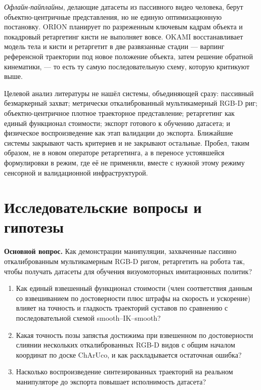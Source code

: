 \documentclass[12pt, a4paper, oneside]{report}
\begin{document}
\emph{Офлайн-пайплайны}, делающие датасеты из пассивного видео человека, берут
объектно-центричные представления, но не единую оптимизационную постановку. ORION
планирует по разреженным ключевым кадрам объекта и покадровый ретаргетинг кисти не
выполняет вовсе. OKAMI восстанавливает модель тела и кисти и ретаргетит в две
развязанные стадии --- варпинг референсной траектории под новое положение объекта,
затем решение обратной кинематики, --- то есть ту самую последовательную схему,
которую критикуют выше.

Целевой анализ литературы не нашёл системы, объединяющей сразу: пассивный
безмаркерный захват; метрически откалиброванный мультикамерный RGB-D риг;
объектно-центричное плотное траекторное представление; ретаргетинг как единый
функционал стоимости; экспорт готового к обучению датасета; и физическое
воспроизведение как этап валидации до экспорта. Ближайшие системы закрывают часть
критериев и не закрывают остальные. Пробел, таким образом, не в новом операторе
ретаргетинга, а в переносе устоявшейся формулировки в режим, где её не применяли,
вместе с нужной этому режиму сенсорной и валидационной инфраструктурой.

\section{Исследовательские вопросы и гипотезы}

\noindent\textbf{Основной вопрос.} Как демонстрации манипуляции, захваченные
пассивно откалиброванным мультикамерным RGB-D ригом, ретаргетить на робота так,
чтобы получать датасеты для обучения визуомоторных имитационных политик?

\begin{enumerate}[label=\textbf{ИВ\arabic*.}, leftmargin=2.6em]
  \item Как единый взвешенный функционал стоимости (член соответствия данным со
        взвешиванием по достоверности плюс штрафы на скорость и ускорение) влияет
        на точность и гладкость траекторий суставов по сравнению с последовательной
        схемой smooth--IK--smooth?
  \item Какая точность позы запястья достижима при взвешенном по достоверности
        слиянии нескольких откалиброванных RGB-D видов с общим началом координат по
        доске ChArUco, и как раскладывается остаточная ошибка?
  \item Насколько воспроизведение синтезированных траекторий на реальном
        манипуляторе до экспорта повышает исполнимость датасета?
\end{enumerate}
\end{document}
